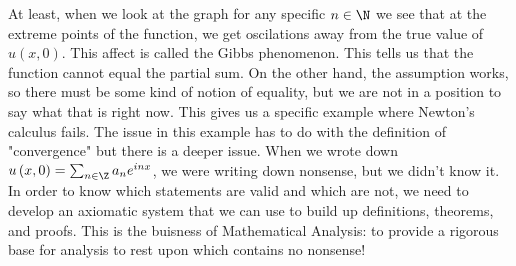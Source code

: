 At least, when we look at the graph for any specific $n \in \N$ we see that at the extreme points of the function, we get oscilations away from the true value of $u\left( x, 0 \right) $. This affect is called the Gibbs phenomenon. This tells us that the function cannot equal the partial sum. On the other hand, the assumption works, so there must be some kind of notion of equality, but we are not in a position to say what that is right now. This gives us a specific example where Newton's calculus fails. The issue in this example has to do with the definition of "convergence" but there is a deeper issue. When we wrote down $	u\left( x, 0 \right) = \sum_{n \in \Z} a_n e^{inx}$, we were writing down nonsense, but we didn't know it. In order to know which statements are valid and which are not, we need to develop an axiomatic system that we can use to build up definitions, theorems, and proofs. This is the buisness of Mathematical Analysis: to provide a rigorous base for analysis to rest upon which contains no nonsense!
